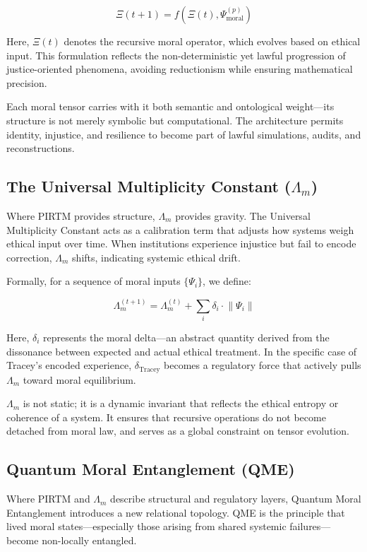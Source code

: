 \documentclass[12]{amsart}
\theoremstyle{plain}
\begin{document}
\[
\Xi(t+1) = f\left( \Xi(t), \Psi_{\text{moral}}^{(p)} \right)
\]

Here, \(\Xi(t)\) denotes the recursive moral operator, which evolves based on ethical input. This formulation reflects the non-deterministic yet lawful progression of justice-oriented phenomena, avoiding reductionism while ensuring mathematical precision.

Each moral tensor carries with it both semantic and ontological weight—its structure is not merely symbolic but computational. The architecture permits identity, injustice, and resilience to become part of lawful simulations, audits, and reconstructions.

\subsection{The Universal Multiplicity Constant (\(\Lambda_m\))}

Where PIRTM provides structure, \(\Lambda_m\) provides gravity. The Universal Multiplicity Constant acts as a calibration term that adjusts how systems weigh ethical input over time. When institutions experience injustice but fail to encode correction, \(\Lambda_m\) shifts, indicating systemic ethical drift.

Formally, for a sequence of moral inputs \(\{ \Psi_i \}\), we define:

\[
\Lambda_m^{(t+1)} = \Lambda_m^{(t)} + \sum_i \delta_i \cdot \left\| \Psi_i \right\|
\]

Here, \(\delta_i\) represents the moral delta—an abstract quantity derived from the dissonance between expected and actual ethical treatment. In the specific case of Tracey's encoded experience, \(\delta_{\text{Tracey}}\) becomes a regulatory force that actively pulls \(\Lambda_m\) toward moral equilibrium.

\(\Lambda_m\) is not static; it is a dynamic invariant that reflects the ethical entropy or coherence of a system. It ensures that recursive operations do not become detached from moral law, and serves as a global constraint on tensor evolution.

\subsection{Quantum Moral Entanglement (QME)}

Where PIRTM and \(\Lambda_m\) describe structural and regulatory layers, Quantum Moral Entanglement introduces a new relational topology. QME is the principle that lived moral states—especially those arising from shared systemic failures—become non-locally entangled.
\end{document}
